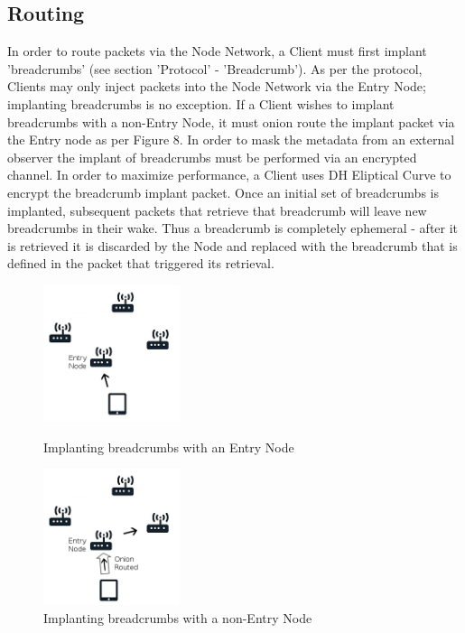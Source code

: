 \documentclass{article}
\begin{document}
\subsection{Routing}
In order to route packets via the Node Network, a Client must first implant 'breadcrumbs' (see section 'Protocol' - 'Breadcrumb'). As per the protocol, Clients may only
inject packets into the Node Network via the Entry Node; implanting breadcrumbs is no exception. If a Client wishes to implant breadcrumbs with a non-Entry Node, it 
must onion route the implant packet via the Entry node as per Figure 8. In order to mask the metadata from an external observer the implant of breadcrumbs must be performed 
via an encrypted channel. In order to maximize performance, a Client uses DH Eliptical Curve to encrypt the breadcrumb implant packet. Once an initial set of breadcrumbs is 
implanted, subsequent packets that retrieve that breadcrumb will leave new breadcrumbs in their wake. Thus a breadcrumb is completely ephemeral - after it is retrieved it is 
discarded by the Node and replaced with the breadcrumb that is defined in the packet that triggered its retrieval.
\begin{figure}[h]
\centering
\begin{minipage}{.4\textwidth}
  	\centering
  	\includegraphics[width=4cm,height=4cm,keepaspectratio]{img/BreadcrumbPlacement.png}
	\caption{Implanting breadcrumbs with an Entry Node}
\end{minipage}
\hspace{1cm}
\begin{minipage}{.4\textwidth}
  	\centering
	\includegraphics[width=4cm,height=4cm,keepaspectratio]{img/BreadcrumbPlacement1.png}
	\caption{Implanting breadcrumbs with a non-Entry Node}
\end{minipage}
\end{figure}
\end{document}
